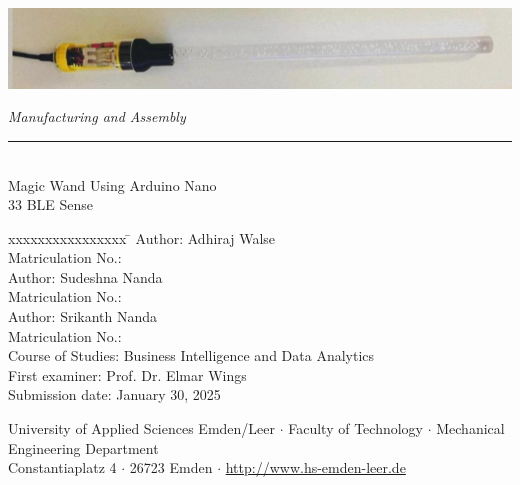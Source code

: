 %
%

\begin{titlepage}
    
    \begin{flushleft} 
        \includegraphics[width=14cm]{General/Logo.jpeg}
    \end{flushleft} 
    
    \begin{flushright}
        \vspace{2cm}
        \LARGE \textsl{Manufacturing and Assembly}\\
        \rule{0.6\textwidth}{0.4pt} ~\\
        \vspace{0.5cm}
        \textsf{\LARGE Magic Wand Using Arduino Nano}\\
        \textsf{\LARGE 33 BLE Sense}
    \end{flushright}
    
    \vspace{3cm}
    \large
    \begin{tabbing}
        xxxxxxxxxxxxxxxx \= \kill
        Author: \> Adhiraj Walse\\
        Matriculation No.: \\
         Author: \> Sudeshna Nanda\\
        Matriculation No.: \\
        	Author: \> Srikanth Nanda\\
        Matriculation No.: \\
        Course of Studies: \> Business Intelligence and Data Analytics\\ [0.5cm]
        First examiner: \> Prof. Dr. Elmar Wings \\
        Submission date: \> January 30, 2025\\
    \end{tabbing}
    
    \vspace{3cm}
    \small
    \begin{center}
        University of Applied Sciences Emden/Leer $\cdot$ 
        Faculty of Technology $\cdot$ 
        Mechanical Engineering Department \\
        Constantiaplatz 4 $\cdot$ 
        26723 Emden $\cdot$ 
        \url{http://www.hs-emden-leer.de}
    \end{center}
    
\end{titlepage}
